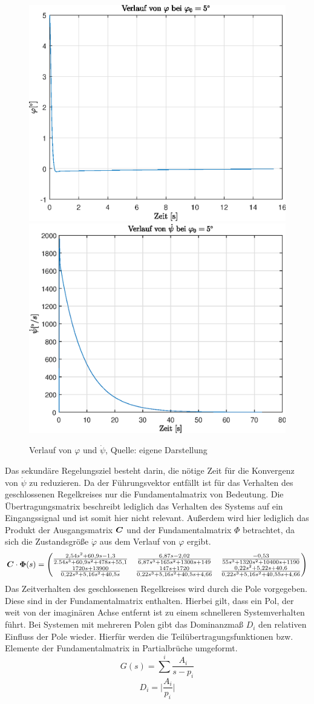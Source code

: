 \begin{figure}[!h]
\centering
\includegraphics[width=0.45\linewidth]{4_Regelungstechnik/img/x0_phi}
\includegraphics[width=0.45\linewidth]{4_Regelungstechnik/img/x0_psi__d}
\caption{Verlauf von $\varphi$ und $\dot{\psi}$, Quelle: eigene Darstellung}
\end{figure}
Das sekundäre Regelungsziel besteht darin, die nötige Zeit für die Konvergenz von $\dot{\psi}$ zu reduzieren. Da der Führungsvektor entfällt ist für das Verhalten des geschlossenen Regelkreises nur die Fundamentalmatrix von Bedeutung. Die Übertragungsmatrix beschreibt lediglich das Verhalten des Systems auf ein Eingangssignal und ist somit hier nicht relevant. Außerdem wird hier lediglich das Produkt der Ausgangsmatrix $\boldsymbol{C}$ und der Fundamentalmatrix $\Phi$ betrachtet, da sich die Zustandsgröße $\dot{\varphi}$ aus dem Verlauf von $\varphi$ ergibt.
\begin{equation}
\boldsymbol{C}\cdot\boldsymbol{\Phi}(s) = \begin{pmatrix}
\frac{2,54s^2+60,9s-1,3}{2.54s^3+60,9s^2+478s+55,1} &
\frac{6,87s-2,02}{6,87s^3+165s^2+1300s+149} &
\frac{-0,53}{55s^3+1320s^2+10400s+1190} \\
\frac{1720s + 13900}{0,22s^3+5,16s^2+40,5s} &
\frac{147s+1720}{0,22s^3+5,16s^2+40,5s+4,66} &
\frac{0,22s^2+5,22s+40,6}{0,22s^3+5,16s^2+40,55s+4,66}
\end{pmatrix}
\end{equation}
Das Zeitverhalten des geschlossenen Regelkreises wird durch die Pole vorgegeben. Diese sind in der Fundamentalmatrix enthalten. Hierbei gilt, dass ein Pol, der weit von der imaginären Achse entfernt ist zu einem schnelleren Systemverhalten führt. Bei Systemen mit mehreren Polen gibt das Dominanzmaß $D_i$ den relativen Einfluss der Pole wieder. Hierfür werden die Teilübertragungsfunktionen bzw. Elemente der Fundamentalmatrix in Partialbrüche umgeformt.
\begin{equation}
G(s) = \sum^i \frac{A_i}{s-p_i}
\end{equation} 
\begin{equation}
D_i = \vert\frac{A_i}{p_i}\vert
\end{equation}

